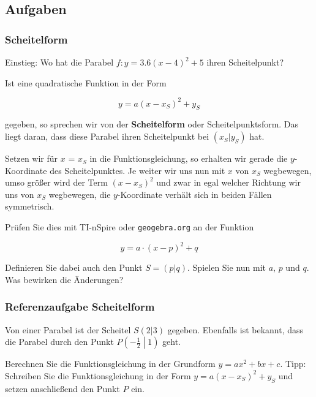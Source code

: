 \subsection*{Aufgaben}
\newpage

\subsubsection{Scheitelform}
Einstieg: Wo hat die Parabel $f: y=3.6(x-4)^2 + 5$ ihren
Scheitelpunkt?


Ist eine quadratische Funktion in der Form
\begin{gesetz}{}{}
$$y = a(x-x_S)^2 + y_S$$
\end{gesetz}
gegeben, so sprechen wir von der \textbf{Scheitelform} oder Scheitelpunktsform.
Das liegt daran, dass diese Parabel ihren Scheitelpunkt bei
$(x_S|y_S)$ hat.

Setzen wir für $x$ = $x_S$ in die Funktionsgleichung, so erhalten wir
gerade die $y$-Koordinate des Scheitelpunktes. Je weiter wir uns nun
mit $x$ von $x_S$ wegbewegen, umso größer wird der Term $(x-x_S)^2$
und zwar in egal welcher Richtung wir uns von $x_S$ wegbewegen, die
$y$-Koordinate verhält sich in beiden Fällen symmetrisch.

Prüfen Sie dies mit TI-nSpire oder \texttt{geogebra.org} an der Funktion

$$y = a\cdot{}(x-p)^2 + q$$

Definieren Sie dabei auch den Punkt $S=(p|q)$. Spielen Sie nun mit
$a$, $p$ und $q$. Was bewirken die Änderungen?
\newpage


\subsubsection{Referenzaufgabe Scheitelform}
Von einer Parabel ist der Scheitel $S(2|3)$ gegeben. Ebenfalls ist bekannt, dass die Parabel durch den Punkt $P\left(-\frac{1}{2}\middle|1\right)$ geht.

  Berechnen Sie die Funktionsgleichung in der Grundform $y = ax^2 + bx + c$. Tipp:
  Schreiben Sie die Funktionsgleichung in der Form $y=a(x - x_S)^2 +  y_S$ und setzen anschließend den Punkt $P$ ein.


